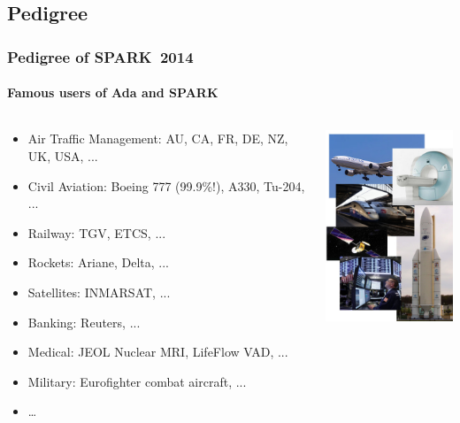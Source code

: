 \subsection*{Pedigree}
\begin{frame}
  \frametitle{Pedigree of SPARK~2014}
  \framesubtitle{Famous users of Ada and SPARK}
  \begin{columns}
    \begin{column}[T]{0.55\textwidth}
      \begin{itemize}
      \item Air Traffic Management: AU, CA, FR, DE, NZ, UK, USA, ...
      \item Civil Aviation: Boeing 777 (99.9\%!), A330, Tu-204, ...
      \item Railway: TGV, ETCS, ...
      \item Rockets: Ariane, Delta, ...
      \item Satellites: INMARSAT, ...
      \item Banking: Reuters, ...
      \item Medical: JEOL Nuclear MRI, LifeFlow VAD, ...
      \item Military: Eurofighter combat aircraft, ...
      \item \dots
      \end{itemize}
    \end{column}
    \begin{column}[T]{0.45\textwidth}
      \vspace*{0cm}\includegraphics[width=4.5cm]{content/images/spark/users}
    \end{column}
  \end{columns}
\end{frame}
\addtocounter{clock}{2}


